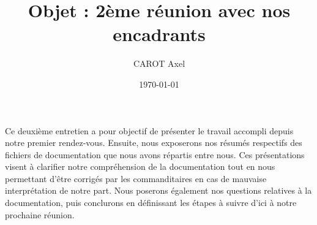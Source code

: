 \documentclass{article}
\title{Objet : 2ème réunion avec nos encadrants}
\author{CAROT Axel}
\date{\today}
\begin{document}
\maketitle

Ce deuxième entretien a pour objectif de présenter le travail accompli depuis notre premier rendez-vous. Ensuite, nous exposerons nos résumés respectifs des fichiers de documentation que nous avons répartis entre nous. Ces présentations visent à clarifier notre compréhension de la documentation tout en nous permettant d'être corrigés par les commanditaires en cas de mauvaise interprétation de notre part. Nous poserons également nos questions relatives à la documentation, puis conclurons en définissant les étapes à suivre d'ici à notre prochaine réunion. 
\end{document}

